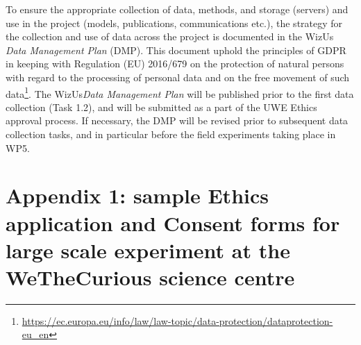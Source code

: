 \documentclass[11pt,a4paper]{report}
\newcommand{\project}{WizUs\xspace}
\newcommand{\eu}[1]{}
\begin{document}
To ensure the appropriate collection of data, methods, and storage (servers) and
use in the project (models, publications, communications etc.), the strategy for
the collection and use of data across the project is documented in the \project
\emph{Data Management Plan} (DMP). This document uphold the principles of GDPR in
keeping with Regulation (EU) 2016/679 on the protection of natural persons with
regard to the processing of personal data and on the free movement of such
data\footnote{\url{https://ec.europa.eu/info/law/law-topic/data-protection/dataprotection-eu_en}}.
The \project \emph{Data Management Plan} will be published prior to the first
data collection (Task 1.2), and will be submitted as a part of the UWE Ethics
approval process. If necessary, the DMP will be revised prior to subsequent data
collection tasks, and in particular before the field experiments taking place in
WP5.

 
\eu{
If you have entered any ethics issues in the ethical issue table in the administrative proposal forms, you must:
    • submit an ethics self-assessment, which:
        ◦ describes how the proposal meets the national legal and ethical requirements of the country or countries where the tasks raising ethical issues are to be carried out;
        ◦ explains in detail how you intend to address the issues in the ethical issues table, in particular as regards:
        ◦ research objectives (e.g. study of vulnerable populations, dual use, etc.)
        ◦ research methodology (e.g. clinical trials, involvement of children and related consent procedures, protection of any data collected, etc.)
        ◦ the potential impact of the research (e.g. dual use issues, environmental damage, stigmatisation  of  particular  social  groups,  political  or  financial  retaliation, benefit-sharing,  malevolent use , etc.).
    • provide the documents that you need under national law(if you already have them), e.g.:
        ◦ an ethics committee opinion;
        ◦ the document notifying activities raising ethical issues or authorising such activities
 If these documents are not in English, you must also submit an English summary of them(containing, if available, the conclusions of the committee or authority concerned).
 If you plan to request these documents specifically for the project you are
 proposing, your request must contain an explicit reference to the project
 title.
}

\newpage
\section{Appendix 1: sample Ethics application and Consent forms for large scale
experiment at the WeTheCurious science centre}
\end{document}
